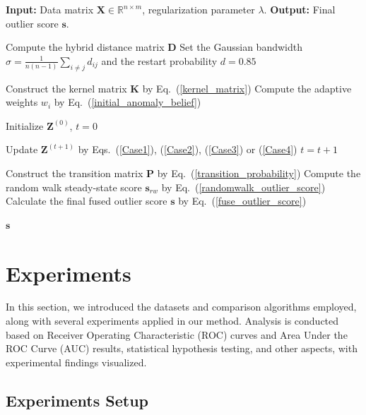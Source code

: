 \documentclass[ASNA,twocolumn]{USG} %
\begin{document}
\begin{algorithm}
\caption{\enskip KSRA algorithm}\label{alg1}
\begin{algorithmic}
    \State \textbf{Input:} Data matrix $\boldsymbol{X} \in \mathbb{R}^{n \times m}$, regularization parameter $\lambda$.
    \State \textbf{Output:} Final outlier score $\boldsymbol{s}$.

    \State Compute the hybrid distance matrix $\boldsymbol{D}$
    \State Set the Gaussian bandwidth $\sigma = \frac{1}{n(n-1)}\sum_{i\ne j}d_{ij}$ and the restart probability $d=0.85$
    
    \State Construct the kernel matrix $\boldsymbol{K}$ by Eq.~(\ref{kernel_matrix})
    \State Compute the adaptive weights $w_{i}$ by Eq.~(\ref{initial_anomaly_belief})
    
    \State Initialize $\boldsymbol{Z}^{(0)}$, $t=0$
    
        \State Update $\boldsymbol{Z}^{(t+1)}$ by Eqs.~(\ref{Case1}), (\ref{Case2}), (\ref{Case3}) or (\ref{Case4})
        \State $t = t + 1$
    \EndWhile
    
    \State Construct the transition matrix $\boldsymbol{P}$ by Eq.~(\ref{transition_probability})
    \State Compute the random walk steady-state score $\boldsymbol{s}_{rw}$ by Eq.~(\ref{randomwalk_outlier_score})
    \State Calculate the final fused outlier score $\boldsymbol{s}$ by Eq.~(\ref{fuse_outlier_score})
    
    \State \Return $\boldsymbol{s}$
\end{algorithmic}
\end{algorithm}

\section{Experiments}\label{Experiments}

In this section, we introduced the datasets and comparison algorithms employed, along with several experiments applied in our method. Analysis is conducted based on Receiver Operating
Characteristic (ROC) curves and Area Under the ROC
Curve (AUC) results, statistical hypothesis testing, and other aspects, with experimental findings visualized.

\subsection{Experiments Setup}
\end{document}

